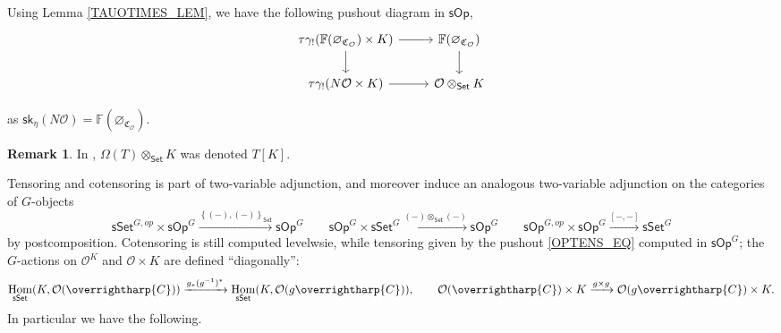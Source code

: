 \documentclass[a4paper,10pt
,draft
]{article}%
\numberwithin{equation}{section}
\numberwithin{figure}{section}
\theoremstyle{definition} %
\newtheorem{remark}[equation]{Remark}%
\newcommand{\set}[1]{\left\{#1\right\}}%
\newcommand{\vect}[1]{\text{\overrightharp{\ensuremath{#1}}}}
\newcommand{\Set}{\ensuremath{\mathsf{Set}}}
\newcommand{\sSet}{\ensuremath{\mathsf{sSet}}}%
\newcommand{\sOp}{\ensuremath{\mathsf{sOp}}}%
\DeclareMathOperator{\Hom}{Hom}%
\renewcommand{\O}{\ensuremath{\mathcal O}}
\newcommand{\1}{\ensuremath{\mathbbm 1}}%
\begin{document}
{\color{OliveGreen} %
	Using Lemma \ref{TAUOTIMES_LEM}, we have the following pushout diagram in $\sOp$,
\begin{equation}
      \label{OPTENS_EQ}
      \begin{tikzcd}
            \tau\gamma_!(\mathbb F(\varnothing_{\mathfrak C_\O}) \times K) \arrow[d] \arrow[r]
&
\mathbb F(\varnothing_{\mathfrak C_\O}) \arrow[d]
            \\
            \tau\gamma_!(N\O \times K)
            \arrow[r]
            &
            \O \otimes_\Set K
      \end{tikzcd}
\end{equation}

as $\mathsf{sk}_\eta(N \O) = \mathbb F(\varnothing_{\mathfrak C_\O})$.

} %



\begin{remark}
      In \cite[\S 7.1]{CM13b}, $\Omega(T) \otimes_{\Set} K$ was denoted $T[K]$.
\end{remark}

Tensoring and cotensoring is part of two-variable adjunction,
and moreover induce an analogous two-variable adjunction on the categories of $G$-objects 
\[
      \sSet^{G,op} \times \sOp^G \xrightarrow{\set{(-),(-)}_\Set} \sOp^G
      \qquad
      \sOp^G \times \sSet^G \xrightarrow{(-) \otimes_\Set (-)} \sOp^G
      \qquad
      \sOp^{G,op} \times \sOp^G \xrightarrow{[-,-]} \sSet^G
\]
by postcomposition.
{\color{OliveGreen} %
  Cotensoring is still computed levelwsie, while tensoring given by the pushout \eqref{OPTENS_EQ} computed in $\sOp^G$;
  the $G$-actions on $\O^K$ and $\O \times K$ are defined ``diagonally'':
  \begin{equation}
        \label{DIAGTENS_EQ}
        \Hom_{\sSet}(K,\O(\vect C)) \xrightarrow{g_{\**}(g^{-1})^{\**}} \Hom_{\sSet}(K, \O(g \vect C)),
        \qquad
        \O(\vect C) \times K \xrightarrow{g \times g} \O(g \vect C) \times K.
  \end{equation}
} %
In particular we have the following.
\end{document}
